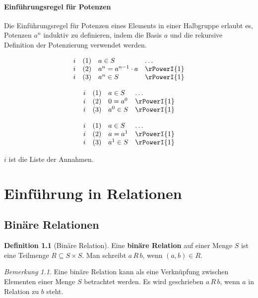 \documentclass{book}
\theoremstyle{plain}
\theoremstyle{remark}
\newtheorem*{remark}{Bemerkung}
\theoremstyle{definition}
\newtheorem{definition}{Definition}[section]
\begin{document}
\subsubsection*{Einführungsregel für Potenzen}
\label{rule:rPowerI}
Die Einführungsregel für Potenzen eines Elements in einer Halbgruppe erlaubt es, Potenzen \(a^n\) induktiv zu definieren, indem die Basis \(a\) und die rekursive Definition der Potenzierung verwendet werden.

\[
\begin{array}{llll}
    i   & (1) & a \in S & \dots \\
    i   & (2) & a^n = a^{n-1} \cdot a & \rPowerI{1} \\
    i   & (3) & a^n\in S & \rPowerI{1} \\
\end{array}
\]

\[
\begin{array}{llll}
    i   & (1) & a \in S & \dots \\
    i   & (2) & 0 = a^{0} & \rPowerI{1} \\
    i   & (3) & a^{0}\in S & \rPowerI{1} \\
\end{array}
\]

\[
\begin{array}{llll}
    i   & (1) & a \in S & \dots \\
    i   & (2) & a = a^{1} & \rPowerI{1} \\
    i   & (3) & a^{1}\in S & \rPowerI{1} \\
\end{array}
\]

\(i\) ist die Liste der Annahmen.

\chapter{Einführung in Relationen}

\section{Binäre Relationen}

\begin{definition}[Binäre Relation]
    Eine \textbf{binäre Relation} auf einer Menge \(S\) ist eine Teilmenge \(R \subseteq S \times S\). Man schreibt \(a \, R \, b\), wenn \((a,b) \in R\).
\end{definition}

\begin{remark}
    Eine binäre Relation kann als eine Verknüpfung zwischen Elementen einer Menge \(S\) betrachtet werden. Es wird geschrieben \(a \, R \, b\), wenn \(a\) in Relation zu \(b\) steht.
\end{remark}
\end{document}
